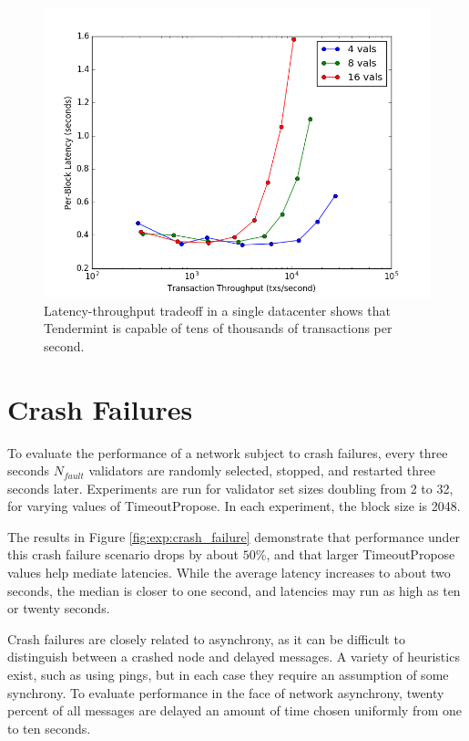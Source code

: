 \begin{figure}[]
	\includegraphics[width=\linewidth,height=\textheight,keepaspectratio]{figures/single_datacenter/latency-throughput.png}
    	\centering
	\caption[Latency-throughput in non-faulty network, single data center]{Latency-throughput tradeoff in a single datacenter shows that Tendermint is capable of tens of thousands of transactions per second.}
	\label{fig:exp:single}
\end{figure}

\section{Crash Failures}

To evaluate the performance of a network subject to crash failures, every three seconds $N_{fault}$ validators are randomly selected,
stopped, and restarted three seconds later.
Experiments are run for validator set sizes doubling from 2 to 32, for varying values of TimeoutPropose.
In each experiment, the block size is 2048.

The results in Figure \ref{fig:exp:crash_failure} demonstrate that performance under this crash failure scenario drops by about 
$50\%$, and that larger TimeoutPropose values help mediate latencies. While the average latency increases to about two seconds,
the median is closer to one second, and latencies may run as high as ten or twenty seconds.


\ifx
Crash failures are closely related to asynchrony, as it can be difficult to distinguish between a crashed node
and delayed messages. A variety of heuristics exist, such as using pings, 
but in each case they require an assumption of some synchrony. 
To evaluate performance in the face of network asynchrony, twenty percent of all messages are delayed an amount of time chosen uniformly 
from one to ten seconds.
\fi

